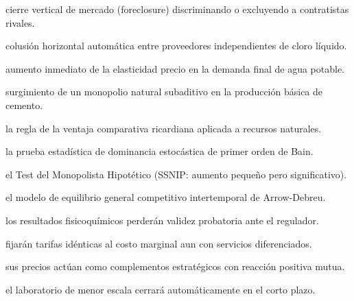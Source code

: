 \begin{opts}
    \item cierre vertical de mercado (foreclosure) discriminando o excluyendo a contratistas rivales.
    \item colusión horizontal automática entre proveedores independientes de cloro líquido.
    \item aumento inmediato de la elasticidad precio en la demanda final de agua potable.
    \item surgimiento de un monopolio natural subaditivo en la producción básica de cemento.
\end{opts}

\begin{opts}
    \item la regla de la ventaja comparativa ricardiana aplicada a recursos naturales.
    \item la prueba estadística de dominancia estocástica de primer orden de Bain.
    \item el Test del Monopolista Hipotético (SSNIP: aumento pequeño pero significativo).
    \item el modelo de equilibrio general competitivo intertemporal de Arrow-Debreu.
\end{opts}

\begin{opts}
    \item los resultados fisicoquímicos perderán validez probatoria ante el regulador.
    \item fijarán tarifas idénticas al costo marginal aun con servicios diferenciados.
    \item sus precios actúan como complementos estratégicos con reacción positiva mutua.
    \item el laboratorio de menor escala cerrará automáticamente en el corto plazo.
\end{opts}


